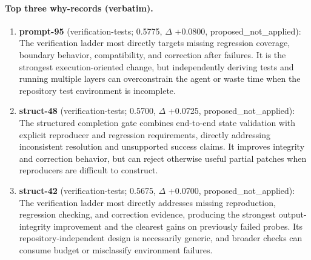 \paragraph{Top three why-records (verbatim).}\begin{enumerate}\itemsep1pt
\item \textbf{prompt-95} (verification-tests; 0.5775, $\Delta$ +0.0800, proposed\_not\_applied): The verification ladder most directly targets missing regression coverage, boundary behavior, compatibility, and correction after failures. It is the strongest execution-oriented change, but independently deriving tests and running multiple layers can overconstrain the agent or waste time when the repository test environment is incomplete.
\item \textbf{struct-48} (verification-tests; 0.5700, $\Delta$ +0.0725, proposed\_not\_applied): The structured completion gate combines end-to-end state validation with explicit reproducer and regression requirements, directly addressing inconsistent resolution and unsupported success claims. It improves integrity and correction behavior, but can reject otherwise useful partial patches when reproducers are difficult to construct.
\item \textbf{struct-42} (verification-tests; 0.5675, $\Delta$ +0.0700, proposed\_not\_applied): The verification ladder most directly addresses missing reproduction, regression checking, and correction evidence, producing the strongest output-integrity improvement and the clearest gains on previously failed probes. Its repository-independent design is necessarily generic, and broader checks can consume budget or misclassify environment failures.
\end{enumerate}
